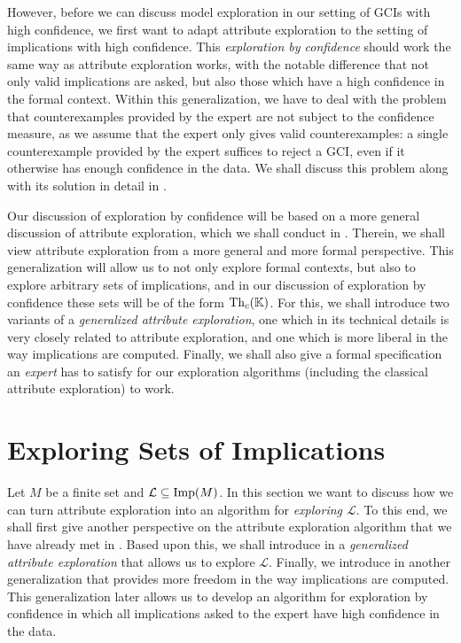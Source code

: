 However, before we can discuss model exploration in our setting of GCIs with high
confidence, we first want to adapt attribute exploration to the setting of implications
with high confidence.  This \emph{exploration by confidence} should work the same way as
attribute exploration works, with the notable difference that not only valid implications
are asked, but also those which have a high confidence in the formal context.  Within this
generalization, we have to deal with the problem that counterexamples provided by the
expert are not subject to the confidence measure, as we assume that the expert only gives
valid counterexamples: a single counterexample provided by the expert suffices to reject a
GCI, even if it otherwise has enough confidence in the data.  We shall discuss this
problem along with its solution in detail in .

Our discussion of exploration by confidence will be based on a more general discussion of
attribute exploration, which we shall conduct in .  Therein, we
shall view attribute exploration from a more general and more formal perspective.  This
generalization will allow us to not only explore formal contexts, but also to explore
arbitrary sets of implications, and in our discussion of exploration by confidence these
sets will be of the form $\operatorname{Th}_c({\mathbb{K}})$.  For this, we shall introduce two variants of a
\emph{generalized attribute exploration}, one which in its technical details is very
closely related to attribute exploration, and one which is more liberal in the way
implications are computed.  Finally, we shall also give a formal specification an
\emph{expert} has to satisfy for our exploration algorithms (including the classical
attribute exploration) to work.

\section{Exploring Sets of Implications}
\label{sec:an-abstract-view}

Let $M$ be a finite set and $\mathcal{L} \subseteq \operatorname{Imp}(M)$.  In this section we want to
discuss how we can turn attribute exploration into an algorithm for \emph{exploring
  $\mathcal{L}$}.  To this end, we shall first give another perspective on the attribute
exploration algorithm that we have already met in .  Based upon this,
we shall introduce in  a \emph{generalized attribute
  exploration} that allows us to explore $\mathcal{L}$.  Finally, we introduce in
 another generalization that provides more freedom in the way
implications are computed.  This generalization later allows us to develop an algorithm
for exploration by confidence in which all implications asked to the expert have high
confidence in the data.

